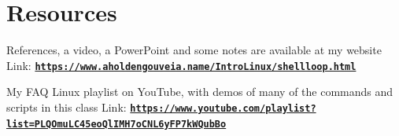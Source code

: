 \documentclass[12pt]{article}
\begin{document}
\section*{Resources}
References, a video, a PowerPoint and some notes are available at my website
Link: \href{https://www.aholdengouveia.name/IntroLinux/shellloop.html}{\textbf{\nolinkurl{https://www.aholdengouveia.name/IntroLinux/shellloop.html}}}

My FAQ Linux playlist on YouTube, with demos of many of the commands and scripts in this class
Link: \href{https://www.youtube.com/playlist?list=PLQOmuLC45eoQlIMH7oCNL6yFP7kWQubBo}{\textbf{\nolinkurl{https://www.youtube.com/playlist?list=PLQOmuLC45eoQlIMH7oCNL6yFP7kWQubBo}}}
\end{document}
